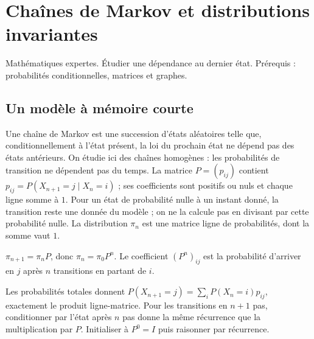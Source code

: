 \documentclass[../cours_tle.tex]{subfiles}
\begin{document}
\setcounter{chapter}{34}
\chapter{Chaînes de Markov et distributions invariantes}
\label{ch:35}
\begin{objectif}
Mathématiques expertes. Étudier une dépendance au dernier état. Prérequis : probabilités conditionnelles, matrices et graphes.
\end{objectif}
\section{Un modèle à mémoire courte}
Une chaîne de Markov est une succession d'états aléatoires telle que, conditionnellement à l'état présent, la loi du prochain état ne dépend pas des états antérieurs. On étudie ici des chaînes homogènes : les probabilités de transition ne dépendent pas du temps.
La matrice $P=(p_{ij})$ contient $p_{ij}=P(X_{n+1}=j\mid X_n=i)$ ; ses coefficients sont positifs ou nuls et chaque ligne somme à $1$.
Pour un état de probabilité nulle à un instant donné, la transition reste une donnée du modèle ; on ne la calcule pas en divisant par cette probabilité nulle.
La distribution $\pi_n$ est une matrice ligne de probabilités, dont la somme vaut $1$.
\begin{theoreme}
$\pi_{n+1}=\pi_nP$, donc $\pi_n=\pi_0P^n$. Le coefficient $(P^n)_{ij}$ est la probabilité d'arriver en $j$ après $n$ transitions en partant de $i$.
\end{theoreme}
\begin{demonstration}
Les probabilités totales donnent $P(X_{n+1}=j)=\sum_iP(X_n=i)p_{ij}$, exactement le produit ligne-matrice.
Pour les transitions en $n+1$ pas, conditionner par l'état après $n$ pas donne la même récurrence que la multiplication par $P$. Initialiser à $P^0=I$ puis raisonner par récurrence.
\end{demonstration}
\end{document}
